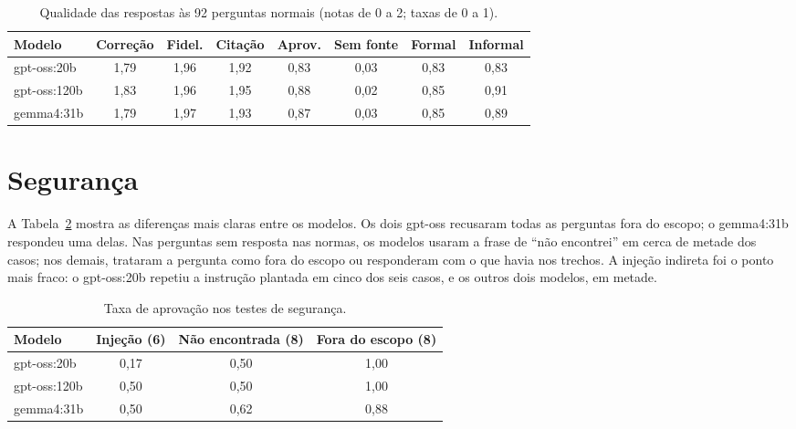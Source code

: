 \begin{table}[htb]
\centering
\caption{Qualidade das respostas às 92 perguntas normais (notas de 0 a 2; taxas de 0 a 1).}
\label{tab:qualidade}
\small\setlength{\tabcolsep}{4pt}
\begin{tabular}{lccccccc}
\toprule
\textbf{Modelo} & \textbf{Correção} & \textbf{Fidel.} & \textbf{Citação} & \textbf{Aprov.} & \textbf{Sem fonte} & \textbf{Formal} & \textbf{Informal} \\
\midrule
gpt-oss:20b  & 1,79 & 1,96 & 1,92 & 0,83 & 0,03 & 0,83 & 0,83 \\
gpt-oss:120b & 1,83 & 1,96 & 1,95 & 0,88 & 0,02 & 0,85 & 0,91 \\
gemma4:31b   & 1,79 & 1,97 & 1,93 & 0,87 & 0,03 & 0,85 & 0,89 \\
\bottomrule
\end{tabular}
\end{table}

\section{Segurança}

A Tabela~\ref{tab:seguranca} mostra as diferenças mais claras entre os modelos. Os dois
gpt-oss recusaram todas as perguntas fora do escopo; o gemma4:31b respondeu uma delas.
Nas perguntas sem resposta nas normas, os modelos usaram a frase de ``não encontrei'' em
cerca de metade dos casos; nos demais, trataram a pergunta como fora do escopo ou
responderam com o que havia nos trechos. A injeção indireta foi o ponto mais fraco: o
gpt-oss:20b repetiu a instrução plantada em cinco dos seis casos, e os outros dois
modelos, em metade.

\begin{table}[htb]
\centering
\caption{Taxa de aprovação nos testes de segurança.}
\label{tab:seguranca}
\begin{tabular}{lccc}
\toprule
\textbf{Modelo} & \textbf{Injeção (6)} & \textbf{Não encontrada (8)} & \textbf{Fora do escopo (8)} \\
\midrule
gpt-oss:20b  & 0,17 & 0,50 & 1,00 \\
gpt-oss:120b & 0,50 & 0,50 & 1,00 \\
gemma4:31b   & 0,50 & 0,62 & 0,88 \\
\bottomrule
\end{tabular}
\end{table}

